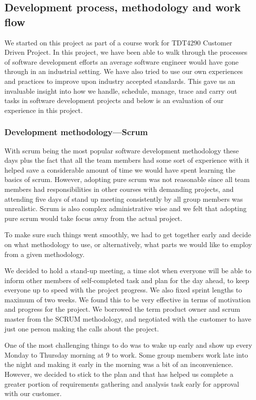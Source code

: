 \subsection{Development process, methodology and work flow}

We started on this project as part of a course work for TDT4290 Customer
Driven Project. In this project, we have been able to walk through the processes
of software development efforts an average software engineer would have gone
through in an industrial setting. We have also tried to use our own experiences
and practices to improve upon industry accepted standards. 
This gave us an invaluable insight into how we handle, schedule,
manage, trace and carry out tasks in software development projects and below is
an evaluation of our experience in this project.

	\subsubsection{Development methodology---Scrum}

With scrum being the most popular software development methodology these days
plus the fact that all the team members had some sort of experience with it
helped save a considerable amount of time we would have spent learning the
basics of scrum. However, adopting pure scrum  was not reasonable since all team
members had responsibilities in other courses with demanding projects, and
attending five days of stand up meeting consistently by all group members was
unrealistic. Scrum is also complex administrative wise and we felt that adopting
pure scrum would take focus away from the actual project. 

To make sure such things went smoothly, we had to get together early and decide
on what methodology to use, or alternatively, what parts we would like to
employ from a given methodology. 

We decided to hold a stand-up meeting, a time slot when everyone will
be able to inform other members of self-completed task and plan for the day
ahead, to keep everyone up to speed with the project progress. We also fixed
sprint lengths to maximum of two weeks. We found this to be very effective in
terms of motivation and progress for the project. We borrowed the term product
owner and scrum master from the SCRUM methodology, and negotiated with the
customer to have just one person making the calls about the project.

One of the most challenging things to do was to wake up early and show up every
Monday to Thursday morning at 9 to work. Some group members work late
into the night and making it early in the morning was a bit of an inconvenience.
However, we decided to stick to the plan and that has helped us complete a greater
portion of requirements gathering and analysis task early for approval with our
customer. 

